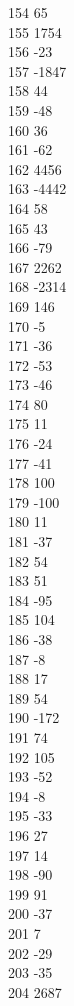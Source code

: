 { 154	65 \\
 155	1754 \\
 156	-23 \\
 157	-1847 \\
 158	44 \\
 159	-48 \\
 160	36 \\
 161	-62 \\
 162	4456 \\
 163	-4442 \\
 164	58 \\
 165	43 \\
 166	-79 \\
 167	2262 \\
 168	-2314 \\
 169	146 \\
 170	-5 \\
 171	-36 \\
 172	-53 \\
 173	-46 \\
 174	80 \\
 175	11 \\
 176	-24 \\
 177	-41 \\
 178	100 \\
 179	-100 \\
 180	11 \\
 181	-37 \\
 182	54 \\
 183	51 \\
 184	-95 \\
 185	104 \\
 186	-38 \\
 187	-8 \\
 188	17 \\
 189	54 \\
 190	-172 \\
 191	74 \\
 192	105 \\
 193	-52 \\
 194	-8 \\
 195	-33 \\
 196	27 \\
 197	14 \\
 198	-90 \\
 199	91 \\
 200	-37 \\
 201	7 \\
 202	-29 \\
 203	-35 \\
 204	2687 \\
}
